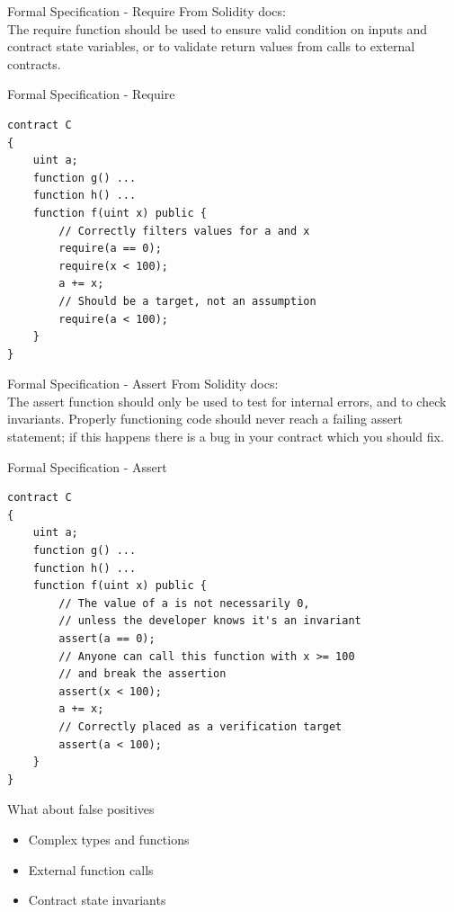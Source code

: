 \documentclass[aspectratio=169,10pt]{beamer}
\begin{document}
\begin{frame}[fragile]{Formal Specification - Require}
From Solidity docs:\\
The require function should be used to ensure valid condition on inputs and
contract state variables, or to validate return values from calls to
external contracts.
\end{frame}
 
\begin{frame}[fragile]{Formal Specification - Require}
\begin{lstlisting}[basicstyle=\scriptsize,xleftmargin=.25\textwidth]
contract C
{
    uint a;
    function g() ...
    function h() ...
    function f(uint x) public {
        // Correctly filters values for a and x
        require(a == 0);
        require(x < 100);
        a += x;
        // Should be a target, not an assumption
        require(a < 100);
    }
}
\end{lstlisting}

\end{frame}

\begin{frame}[fragile]{Formal Specification - Assert}
From Solidity docs:\\
The assert function should only be used to test for internal errors, and to
check invariants.  Properly functioning code should never reach a failing
assert statement; if this happens there is a bug in your contract which you
should fix.
\end{frame}

\begin{frame}[fragile]{Formal Specification - Assert}
\begin{lstlisting}[basicstyle=\scriptsize,xleftmargin=.2\textwidth]
contract C
{
    uint a;
    function g() ...
    function h() ...
    function f(uint x) public {
        // The value of a is not necessarily 0,
        // unless the developer knows it's an invariant
        assert(a == 0);
        // Anyone can call this function with x >= 100
        // and break the assertion
        assert(x < 100);
        a += x;
        // Correctly placed as a verification target
        assert(a < 100);
    }
}
\end{lstlisting}
\end{frame}

\begin{frame}[fragile]{What about false positives}
\begin{itemize}
\item Complex types and functions
\item External function calls
\item Contract state invariants
\end{itemize}
\end{frame}
\end{document}
